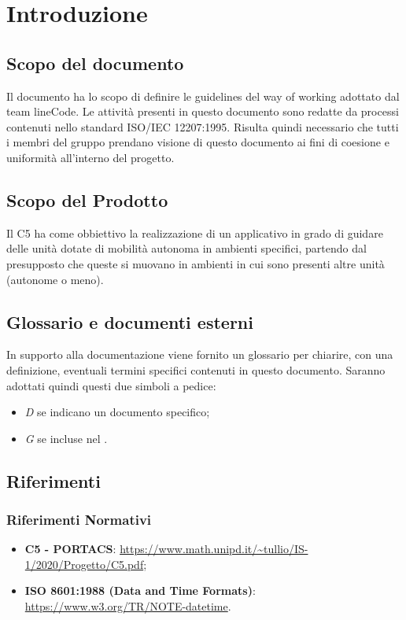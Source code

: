 \documentclass[]{article}
\begin{document}
	
	\newpage
	\section{Introduzione}
		\subsection{Scopo del documento}
		Il documento ha lo scopo di definire le guidelines del way of working adottato dal team lineCode. Le attività presenti in questo documento sono redatte da processi contenuti nello standard ISO/IEC 12207:1995. Risulta quindi necessario che tutti i membri del gruppo prendano visione di questo documento ai fini di coesione e uniformità all'interno del progetto.

		\subsection{Scopo del Prodotto}
		Il  C5 ha come obbiettivo la realizzazione di un applicativo  in grado di guidare delle unità dotate di mobilità autonoma in ambienti specifici, partendo dal presupposto che queste si muovano in ambienti in cui sono presenti altre unità (autonome o meno).

		\subsection{Glossario e documenti esterni}
		In supporto alla documentazione viene fornito un glossario per chiarire, con una definizione, eventuali termini specifici contenuti in questo documento.
		Saranno adottati quindi questi due simboli a pedice:
		\begin{itemize}
			\item \textit{D} se indicano un documento specifico;
			\item \textit{G} se incluse nel .
		\end{itemize}

		\subsection{Riferimenti}
			\subsubsection{Riferimenti Normativi}
			\begin{itemize}
				\item \textbf{{ C5 - PORTACS}}: \url{https://www.math.unipd.it/~tullio/IS-1/2020/Progetto/C5.pdf};
				\item \textbf{{ISO 8601:1988 (Data and Time Formats)}}: \url {https://www.w3.org/TR/NOTE-datetime}. %
			\end{itemize}
\end{document}
